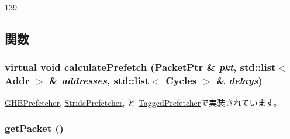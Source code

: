 \begin{DoxyCode}
139 {}
\end{DoxyCode}


\subsection{関数}
\hypertarget{classBasePrefetcher_a3db7131bcae7e87e8146195a6e8be817}{
\subsubsection[{calculatePrefetch}]{\setlength{\rightskip}{0pt plus 5cm}virtual void calculatePrefetch ({\bf PacketPtr} \& {\em pkt}, \/  {\bf std::list}$<$ {\bf Addr} $>$ \& {\em addresses}, \/  {\bf std::list}$<$ {\bf Cycles} $>$ \& {\em delays})}}
\label{classBasePrefetcher_a3db7131bcae7e87e8146195a6e8be817}


\hyperlink{classGHBPrefetcher_a1cc3d838a8314074cfda794f18eb6de9}{GHBPrefetcher}, \hyperlink{classStridePrefetcher_a1cc3d838a8314074cfda794f18eb6de9}{StridePrefetcher}, と \hyperlink{classTaggedPrefetcher_a1cc3d838a8314074cfda794f18eb6de9}{TaggedPrefetcher}で実装されています。\hypertarget{classBasePrefetcher_a248e1528ea5a374640182955f4793d3f}{
\subsubsection[{getPacket}]{ getPacket ()}}
\label{classBasePrefetcher_a248e1528ea5a374640182955f4793d3f}



